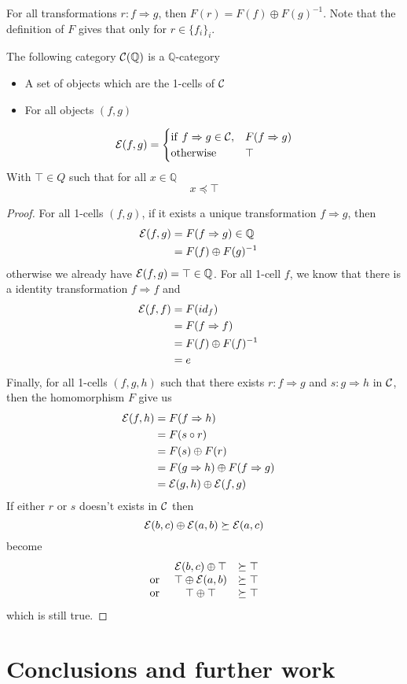 \documentclass[a4paper]{article}
\begin{document}
\begin{corollary}
For all transformations $r: f \Rightarrow g$, then $F(r) = F(f) \oplus F(g)^{-1}$.
Note that the definition of $F$ gives that only for $r \in \{f_i\}_i$.
\end{corollary}

\begin{proposition}
The following category ${\cal C}(\mathbb{Q})$ is a $\mathbb{Q}$-category
\begin{itemize}
\item A set of objects which are the 1-cells of ${\cal C}$
\item For all objects $(f, g)$
\end{itemize}
\[
{\cal E}(f, g) = \begin{cases} {\rm if~} f \Rightarrow g \in {\cal C}, &F(f \Rightarrow g) \cr {\rm otherwise~} &\top \end{cases}
\]
With $\top \in Q$ such that for all $x \in \mathbb{Q}$
\[
x \preceq \top
\]

\begin{proof}
For all 1-cells $(f, g)$, if it exists a unique transformation $f \Rightarrow g$, then
\begin{align}
{\cal E}(f, g) &= F(f \Rightarrow g) \in \mathbb{Q} \cr
&= F(f) \oplus F(g)^{-1}
\end{align}
otherwise we already have ${\cal E}(f, g) = \top \in \mathbb{Q}$.
For all 1-cell $f$, we know that there is a identity transformation $f \Rightarrow f$ and
\begin{align}
{\cal E}(f, f) &= F(id_f) \cr
&= F(f \Rightarrow f)\cr
&= F(f) \oplus F(f)^{-1} \cr
&= e
\end{align}
Finally, for all 1-cells $(f, g, h)$ such that there exists $r: f \Rightarrow g$ and $s: g \Rightarrow h$ in ${\cal C}$, then the homomorphism $F$ give us
\begin{align}
{\cal E}(f, h) &= F(f \Rightarrow h) \cr
&= F(s\circ r) \cr
&= F(s) \oplus F(r) \cr
&= F(g \Rightarrow h) \oplus F(f \Rightarrow g) \cr
&= {\cal E}(g, h) \oplus {\cal E}(f, g)
\end{align}
If either $r$ or $s$ doesn't exists in ${\cal C}$ then
\[
{\cal E}(b, c) \oplus {\cal E}(a, b) \succeq {\cal E}(a, c)
\]
become
\[\begin{matrix}
&{\cal E}(b, c) \oplus \top &\succeq \top \cr
{\rm or~} &\top \oplus {\cal E}(a, b) &\succeq \top \cr
{\rm or~} &\top \oplus \top &\succeq \top
\end{matrix}\]
which is still true.
\end{proof}
\end{proposition}



\section{Conclusions and further work}
\label{sec:conclusion}



\small

\end{document}
